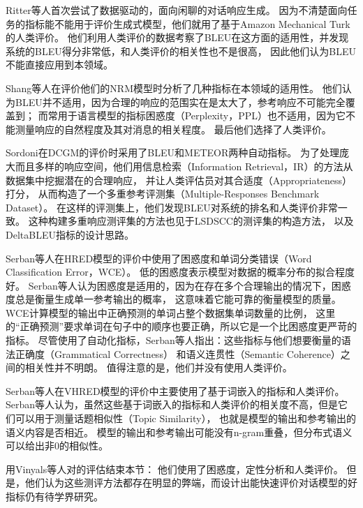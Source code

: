 Ritter等人首次尝试了数据驱动的，面向闲聊的对话响应生成。
因为不清楚面向任务的指标能不能用于评价生成式模型，他们就用了基于Amazon Mechanical Turk的人类评价。
他们利用人类评价的数据考察了BLEU在这方面的适用性，并发现系统的BLEU得分非常低，和人类评价的相关性也不是很高，
因此他们认为BLEU不能直接应用到本领域。


Shang等人在评价他们的NRM模型时分析了几种指标在本领域的适用性。
他们认为BLEU并不适用，因为合理的响应的范围实在是太大了，参考响应不可能完全覆盖到；
而常用于语言模型的指标困惑度（Perplexity，PPL）也不适用，因为它不能测量响应的自然程度及其对消息的相关程度。
最后他们选择了人类评价。

Sordoni在DCGM的评价时采用了BLEU和METEOR两种自动指标。
为了处理庞大而且多样的响应空间，他们用信息检索（Information Retrieval，IR）的方法从数据集中挖掘潜在的合理响应，
并让人类评估员对其合适度（Appropriateness）打分，
从而构造了一个多重参考评测集（Multiple-Responses Benchmark Dataset）。
在这样的评测集上，他们发现BLEU对系统的排名和人类评价非常一致。
这种构建多重响应测评集的方法也见于LSDSCC的测评集的构造方法，
以及DeltaBLEU指标的设计思路。

Serban等人在HRED模型的评价中使用了困惑度和单词分类错误（Word Classification Error，WCE）。
低的困惑度表示模型对数据的概率分布的拟合程度好。
Serban等人认为困惑度是适用的，因为在存在多个合理输出的情况下，困惑度总是衡量生成单一参考输出的概率，
这意味着它能可靠的衡量模型的质量。
WCE计算模型的输出中正确预测的单词占整个数据集单词数量的比例，
这里的“正确预测”要求单词在句子中的顺序也要正确，所以它是一个比困惑度更严苛的指标。
尽管使用了自动化指标，Serban等人指出：这些指标与他们想要衡量的语法正确度（Grammatical Correctness）
和语义连贯性（Semantic Coherence）之间的相关性并不明朗。
值得注意的是，他们并没有使用人类评价。

Serban等人在VHRED模型的评价中主要使用了基于词嵌入的指标和人类评价。
Serban等人认为，虽然这些基于词嵌入的指标和人类评价的相关度不高，但是它们可以用于测量话题相似性（Topic Similarity），
也就是模型的输出和参考输出的语义内容是否相近。
模型的输出和参考输出可能没有n-gram重叠，但分布式语义可以给出非0的相似性。

用Vinyals等人对\cite{GoogleChatbot}的评估结束本节：
他们使用了困惑度，定性分析和人类评价。
但是，他们认为这些测评方法都存在明显的弊端，而设计出能快速评价对话模型的好指标仍有待学界研究。


